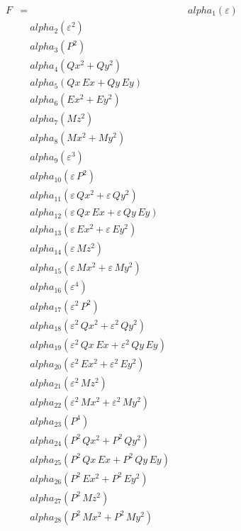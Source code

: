 \documentclass{article}
\begin{document}
\begin{align*}
F &=
  &\quad alpha_{1} \left(ε\right) \\
  &\quad alpha_{2} \left(ε^{2}\right) \\
  &\quad alpha_{3} \left(P^{2}\right) \\
  &\quad alpha_{4} \left(Qx^{2} + Qy^{2}\right) \\
  &\quad alpha_{5} \left(Qx\,Ex + Qy\,Ey\right) \\
  &\quad alpha_{6} \left(Ex^{2} + Ey^{2}\right) \\
  &\quad alpha_{7} \left(Mz^{2}\right) \\
  &\quad alpha_{8} \left(Mx^{2} + My^{2}\right) \\
  &\quad alpha_{9} \left(ε^{3}\right) \\
  &\quad alpha_{10} \left(ε\,P^{2}\right) \\
  &\quad alpha_{11} \left(ε\,Qx^{2} + ε\,Qy^{2}\right) \\
  &\quad alpha_{12} \left(ε\,Qx\,Ex + ε\,Qy\,Ey\right) \\
  &\quad alpha_{13} \left(ε\,Ex^{2} + ε\,Ey^{2}\right) \\
  &\quad alpha_{14} \left(ε\,Mz^{2}\right) \\
  &\quad alpha_{15} \left(ε\,Mx^{2} + ε\,My^{2}\right) \\
  &\quad alpha_{16} \left(ε^{4}\right) \\
  &\quad alpha_{17} \left(ε^{2}\,P^{2}\right) \\
  &\quad alpha_{18} \left(ε^{2}\,Qx^{2} + ε^{2}\,Qy^{2}\right) \\
  &\quad alpha_{19} \left(ε^{2}\,Qx\,Ex + ε^{2}\,Qy\,Ey\right) \\
  &\quad alpha_{20} \left(ε^{2}\,Ex^{2} + ε^{2}\,Ey^{2}\right) \\
  &\quad alpha_{21} \left(ε^{2}\,Mz^{2}\right) \\
  &\quad alpha_{22} \left(ε^{2}\,Mx^{2} + ε^{2}\,My^{2}\right) \\
  &\quad alpha_{23} \left(P^{4}\right) \\
  &\quad alpha_{24} \left(P^{2}\,Qx^{2} + P^{2}\,Qy^{2}\right) \\
  &\quad alpha_{25} \left(P^{2}\,Qx\,Ex + P^{2}\,Qy\,Ey\right) \\
  &\quad alpha_{26} \left(P^{2}\,Ex^{2} + P^{2}\,Ey^{2}\right) \\
  &\quad alpha_{27} \left(P^{2}\,Mz^{2}\right) \\
  &\quad alpha_{28} \left(P^{2}\,Mx^{2} + P^{2}\,My^{2}\right) \\

\end{align*}
\end{document}
